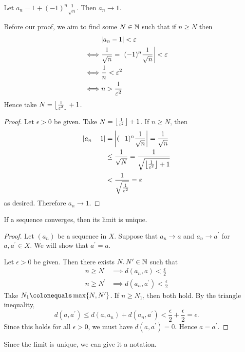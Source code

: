 \begin{example}
Let $a_n=1+(-1)^n\frac{1}{\sqrt{n}}$. Then $a_n\to 1$.

Before our proof, we aim to find some $N\in\mathbb N$ such that if $n\ge N$ then
\begin{align*}
&|a_n-1|<\varepsilon\\
\iff&\frac{1}{\sqrt{n}}=\left|(-1)^n\frac{1}{\sqrt{n}}\right|<\varepsilon\\
\iff&\frac{1}{n}<\varepsilon^2\\
\iff&n>\frac{1}{\varepsilon^2}
\end{align*}
Hence take $N=\left\lfloor \frac{1}{\varepsilon^2} \right\rfloor+1$.

\begin{proof}
Let $\epsilon>0$ be given. Take $N=\left\lfloor \frac{1}{\varepsilon^2} \right\rfloor+1$. If $n\ge N$, then
\begin{align*}
|a_n-1|&=\left|(-1)^n\frac{1}{\sqrt{n}}\right|=\frac{1}{\sqrt{n}}\\
&\le\frac{1}{\sqrt{N}}=\frac{1}{\sqrt{\left\lfloor \frac{1}{\varepsilon^2} \right\rfloor+1}}\\
&<\frac{1}{\sqrt{\frac{1}{\varepsilon^2}}}=\varepsilon
\end{align*}
as desired. Therefore $a_n\to1$.
\end{proof}
\end{example}

\begin{lemma}
If a sequence converges, then its limit is unique.
\end{lemma}

\begin{proof}
Let $(a_n)$ be a sequence in $X$. Suppose that $a_n\to a$ and $a_n\to a^\prime$ for $a,a^\prime\in X$. We will show that $a^\prime=a$.

Let $\epsilon>0$ be given. Then there exists $N,N^\prime\in\mathbb N$ such that
\begin{align*}
n\ge N&\implies d(a_n,a)<\frac{\epsilon}{2}\\
n\ge N^\prime&\implies d(a_n,a^\prime)<\frac{\epsilon}{2}
\end{align*}
Take $N_1\colonequals\max\{N,N^\prime\}$. If $n\ge N_1$, then both hold. By the triangle inequality,
\[d(a,a^\prime)\le d(a,a_n)+d(a_n,a^\prime)<\frac{\epsilon}{2}+\frac{\epsilon}{2}=\epsilon.\]
Since this holds for all $\epsilon>0$, we must have $d(a,a^\prime)=0$. Hence $a=a^\prime$.
\end{proof}

Since the limit is unique, we can give it a notation.

